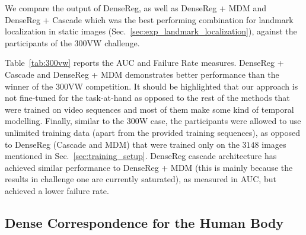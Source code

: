 We compare the output of DenseReg, as well as DenseReg + MDM and DenseReg + Cascade which was the best performing combination for landmark localization in static images (Sec.~\ref{sec:exp_landmark_localization}), against the participants of the 300VW challenge.

Table~\ref{tab:300vw} reports the AUC and Failure Rate measures. DenseReg + Cascade and DenseReg + MDM demonstrates better performance than the winner of the 300VW competition. It should be highlighted that our approach is not fine-tuned for the task-at-hand as opposed to the rest of the methods that were trained on video sequences and most of them make some kind of temporal modelling. Finally, similar to the 300W case, the participants were allowed to use unlimited training data (apart from the provided training sequences), as opposed to DenseReg (Cascade and MDM) that were trained only on the $3148$ images mentioned in Sec.~\ref{sec:training_setup}. DenseReg cascade architecture has achieved similar performance to DenseReg + MDM (this is mainly because the results in challenge one are currently saturated), as measured in AUC, but achieved a lower failure rate.


 

\subsection{Dense Correspondence for the Human Body}
\label{sec:exp_human}


